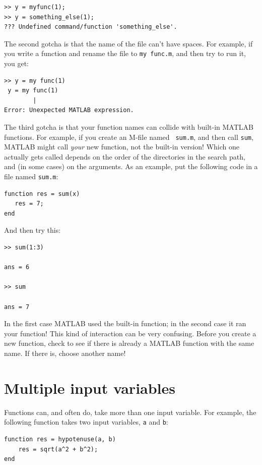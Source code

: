 \documentclass{book}
\begin{document}
\begin{verbatim}
>> y = myfunc(1);
>> y = something_else(1);
??? Undefined command/function 'something_else'.
\end{verbatim}

The second gotcha is that the name of the file can't have spaces.
For example, if you write a function and rename the file to {\tt my func.m},
and then
try to run it, you get:

\begin{verbatim}
>> y = my func(1)
 y = my func(1)
        |
Error: Unexpected MATLAB expression.
\end{verbatim}

The third gotcha is that your function names can collide with built-in
MATLAB functions.  For example, if you create an M-file named {\tt
sum.m}, and then call {\tt sum}, MATLAB might call {\em your} new
function, not the built-in version!  Which one actually gets called
depends on the order of the directories in the search path, and
(in some cases) on the arguments.  As an example, put the following
code in a file named {\tt sum.m}:

\begin{verbatim}
function res = sum(x)
   res = 7;
end
\end{verbatim}

And then try this:

\begin{verbatim}
>> sum(1:3)

ans = 6

>> sum

ans = 7
\end{verbatim}

In the first case MATLAB used the built-in function; in the second
case it ran your function!  This kind of interaction can be very
confusing.  Before you create a new function, check to see if there is
already a MATLAB function with the same name.  If there is, choose
another name!


\section{Multiple input variables}
\label{hypotenuse}

Functions can, and often do, take more than one input variable.
For example, the following function takes two input variables,
{\tt a} and {\tt b}:

\begin{verbatim}
function res = hypotenuse(a, b)
    res = sqrt(a^2 + b^2);
end
\end{verbatim}
\end{document}
